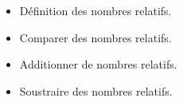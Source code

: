 \begin{prerequis}[Prérequis de $5$\up{e}]    
    \begin{itemize}
        \item Définition des nombres relatifs.
        \item Comparer des nombres relatifs.
        \item Additionner de nombres relatifs.
        \item Soustraire des nombres relatifs.
    \end{itemize}
\end{prerequis}
